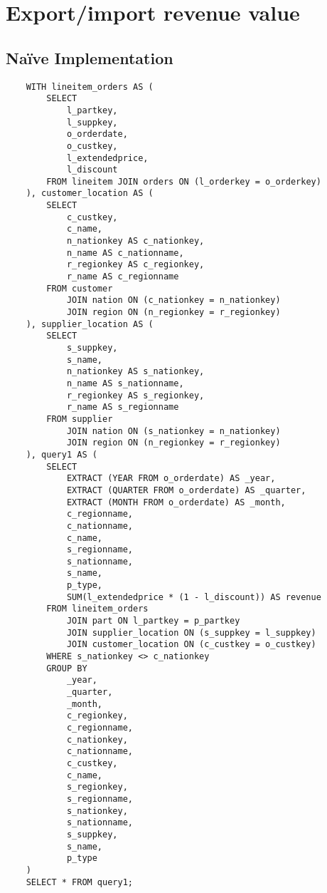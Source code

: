 

\section{Export/import revenue value}

\subsection{Na\"{i}ve Implementation}

\begin{lstlisting}
	WITH lineitem_orders AS (
		SELECT 
			l_partkey, 
			l_suppkey, 
			o_orderdate, 
			o_custkey, 
			l_extendedprice, 
			l_discount
		FROM lineitem JOIN orders ON (l_orderkey = o_orderkey)
	), customer_location AS (
		SELECT 
			c_custkey, 
			c_name, 
			n_nationkey AS c_nationkey, 
			n_name AS c_nationname, 
			r_regionkey AS c_regionkey, 
			r_name AS c_regionname 
		FROM customer 
			JOIN nation ON (c_nationkey = n_nationkey)
			JOIN region ON (n_regionkey = r_regionkey)
	), supplier_location AS (
		SELECT 
			s_suppkey, 
			s_name, 
			n_nationkey AS s_nationkey, 
			n_name AS s_nationname, 
			r_regionkey AS s_regionkey, 
			r_name AS s_regionname 
		FROM supplier 
			JOIN nation ON (s_nationkey = n_nationkey)
			JOIN region ON (n_regionkey = r_regionkey)
	), query1 AS (
		SELECT
			EXTRACT (YEAR FROM o_orderdate) AS _year,
			EXTRACT (QUARTER FROM o_orderdate) AS _quarter,
			EXTRACT (MONTH FROM o_orderdate) AS _month,
			c_regionname,
			c_nationname,
			c_name,
			s_regionname,
			s_nationname,
			s_name,
			p_type,
			SUM(l_extendedprice * (1 - l_discount)) AS revenue
		FROM lineitem_orders 
			JOIN part ON l_partkey = p_partkey
			JOIN supplier_location ON (s_suppkey = l_suppkey)
			JOIN customer_location ON (c_custkey = o_custkey)
		WHERE s_nationkey <> c_nationkey
		GROUP BY
			_year,
			_quarter,
			_month,
			c_regionkey,
			c_regionname,
			c_nationkey,
			c_nationname,
			c_custkey,
			c_name,
			s_regionkey,
			s_regionname,
			s_nationkey,
			s_nationname,
			s_suppkey,
			s_name,
			p_type
	)
	SELECT * FROM query1;
\end{lstlisting}